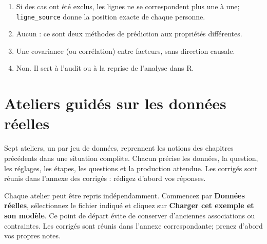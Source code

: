 \documentclass[
  french,
  11pt,
  a4paper,
  DIV=11,
  numbers=noendperiod]{scrreprt}
\providecommand{\tightlist}{%
  \setlength{\itemsep}{0pt}\setlength{\parskip}{0pt}}
\begin{document}
\begin{tcolorbox}[enhanced jigsaw, arc=.35mm, bottomrule=.15mm, bottomtitle=1mm, breakable, colback=white, colbacktitle=quarto-callout-tip-color!10!white, colframe=quarto-callout-tip-color-frame, coltitle=black, left=2mm, leftrule=.75mm, opacityback=0, opacitybacktitle=0.6, rightrule=.15mm, title={Réponses}, titlerule=0mm, toprule=.15mm, toptitle=1mm]

\begin{enumerate}
\def\labelenumi{\arabic{enumi}.}
\tightlist
\item
  Si des cas ont été exclus, les lignes ne se correspondent plus une à
  une; \texttt{ligne\_source} donne la position exacte de chaque
  personne.
\item
  Aucun : ce sont deux méthodes de prédiction aux propriétés
  différentes.
\item
  Une covariance (ou corrélation) entre facteurs, sans direction
  causale.
\item
  Non. Il sert à l'audit ou à la reprise de l'analyse dans R.
\end{enumerate}

\end{tcolorbox}


\chapter{Ateliers guidés sur les données réelles}\label{sec-ateliers}

\begin{tcolorbox}[enhanced jigsaw, arc=.35mm, bottomrule=.15mm, bottomtitle=1mm, breakable, colback=white, colbacktitle=quarto-callout-note-color!10!white, colframe=quarto-callout-note-color-frame, coltitle=black, left=2mm, leftrule=.75mm, opacityback=0, opacitybacktitle=0.6, rightrule=.15mm, title={Comment utiliser ces ateliers}, titlerule=0mm, toprule=.15mm, toptitle=1mm]

Sept ateliers, un par jeu de données, reprennent les notions des
chapitres précédents dans une situation complète. Chacun précise les
données, la question, les réglages, les étapes, les questions et la
production attendue. Les corrigés sont réunis dans l'annexe des corrigés
: rédigez d'abord vos réponses.

\end{tcolorbox}

Chaque atelier peut être repris indépendamment. Commencez par
\textbf{Données réelles}, sélectionnez le fichier indiqué et cliquez sur
\textbf{Charger cet exemple et son modèle}. Ce point de départ évite de
conserver d'anciennes associations ou contraintes. Les corrigés sont
réunis dans l'annexe correspondante; prenez d'abord vos propres notes.
\end{document}
